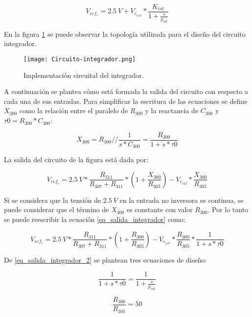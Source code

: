 \begin{equation}
	V_{ref_c}=2.5\:V+V_{e_{ext}}*\frac{K_{int}}{1+\frac{s}{p_{int}}}
\end{equation}

\noindent En la figura \ref{fig:circuito-integrador} se puede observar la topología utilizada para el diseño del circuito integrador.

\begin{figure}[H]
	\centering
	\texttt{[image: Circuito-integrador.png]}
	\caption{Implementación circuital del integrador.}
	\label{fig:circuito-integrador}
\end{figure}

A continuación se plantea cómo está formada la salida del circuito con respecto a cada una de sus entradas. Para simplificar la escritura de las ecuaciones se define $X_{300}$ como la relación entre el paralelo de $R_{300}$ y la reactancia de $C_{300}$ y $\tau 0 = R_{300}*C_{300}$:

\begin{equation}
	X_{300} = R_{300} // \frac{1}{s*C_{300}} = \frac{R_{300}}{1+s*\tau 0}
\end{equation}

La salida del circuito de la figura está dada por:

\begin{equation} \label{eq_salida_integrador}
	V_{ref_c}=2.5\:V*\frac{R_{311}}{R_{307}+R_{311}}*(1+\frac{X_{300}}{R_{305}})-V_{e_{ext}}*\frac{X_{300}}{R_{305}}
\end{equation}

Si se considera que la tensión de $2.5\:V$ en la entrada no inversora es continua, se puede considerar que el término de $X_{300}$ es constante con valor $R_{300}$. Por lo tanto se puede reescribir la ecuación \ref{eq_salida_integrador} como:

\begin{equation} \label{eq_salida_integrador_2}
	V_{ref_c}=2.5\:V*\frac{R_{311}}{R_{307}+R_{311}}*(1+\frac{R_{300}}{R_{305}})-V_{e_{ext}}*\frac{R_{300}}{R_{305}}*\frac{1}{1+s*\tau 0}
\end{equation}

De \ref{eq_salida_integrador_2} se plantean tres ecuaciones de diseño:

\begin{equation} \label{eq_polo_integrador}
	\frac{1}{1+s*\tau 0}=\frac{1}{1+\frac{s}{p_{int}}}
\end{equation}

\begin{equation} \label{eq_ganancia_integrador}
	\frac{R_{300}}{R_{305}}=50
\end{equation}


